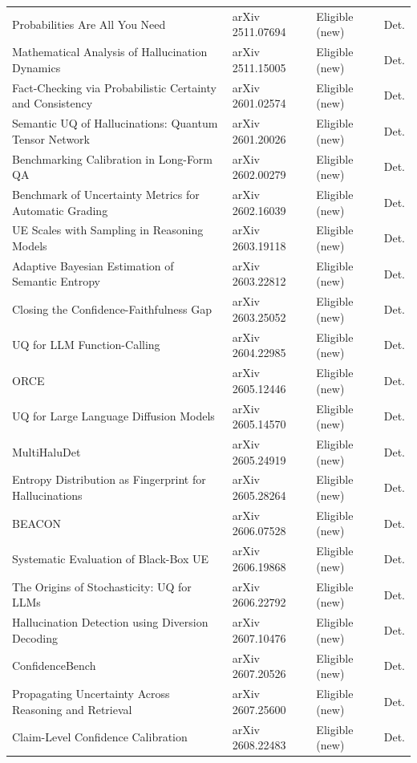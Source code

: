 \documentclass[acmsmall]{acmart}
\begin{document}
\begin{center}
\begin{longtable}{@{}p{5.6cm} p{3.6cm} p{2.4cm} p{0.9cm}@{}}
Probabilities Are All You Need & arXiv 2511.07694 & Eligible (new) & Det. \\
Mathematical Analysis of Hallucination Dynamics & arXiv 2511.15005 & Eligible (new) & Det. \\
Fact-Checking via Probabilistic Certainty and Consistency & arXiv 2601.02574 & Eligible (new) & Det. \\
Semantic UQ of Hallucinations: Quantum Tensor Network & arXiv 2601.20026 & Eligible (new) & Det. \\
Benchmarking Calibration in Long-Form QA & arXiv 2602.00279 & Eligible (new) & Det. \\
Benchmark of Uncertainty Metrics for Automatic Grading & arXiv 2602.16039 & Eligible (new) & Det. \\
UE Scales with Sampling in Reasoning Models & arXiv 2603.19118 & Eligible (new) & Det. \\
Adaptive Bayesian Estimation of Semantic Entropy & arXiv 2603.22812 & Eligible (new) & Det. \\
Closing the Confidence-Faithfulness Gap & arXiv 2603.25052 & Eligible (new) & Det. \\
UQ for LLM Function-Calling & arXiv 2604.22985 & Eligible (new) & Det. \\
ORCE & arXiv 2605.12446 & Eligible (new) & Det. \\
UQ for Large Language Diffusion Models & arXiv 2605.14570 & Eligible (new) & Det. \\
MultiHaluDet & arXiv 2605.24919 & Eligible (new) & Det. \\
Entropy Distribution as Fingerprint for Hallucinations & arXiv 2605.28264 & Eligible (new) & Det. \\
BEACON & arXiv 2606.07528 & Eligible (new) & Det. \\
Systematic Evaluation of Black-Box UE & arXiv 2606.19868 & Eligible (new) & Det. \\
The Origins of Stochasticity: UQ for LLMs & arXiv 2606.22792 & Eligible (new) & Det. \\
Hallucination Detection using Diversion Decoding & arXiv 2607.10476 & Eligible (new) & Det. \\
ConfidenceBench & arXiv 2607.20526 & Eligible (new) & Det. \\
Propagating Uncertainty Across Reasoning and Retrieval & arXiv 2607.25600 & Eligible (new) & Det. \\
Claim-Level Confidence Calibration & arXiv 2608.22483 & Eligible (new) & Det. \\

\end{longtable}
\end{center}
\end{document}
